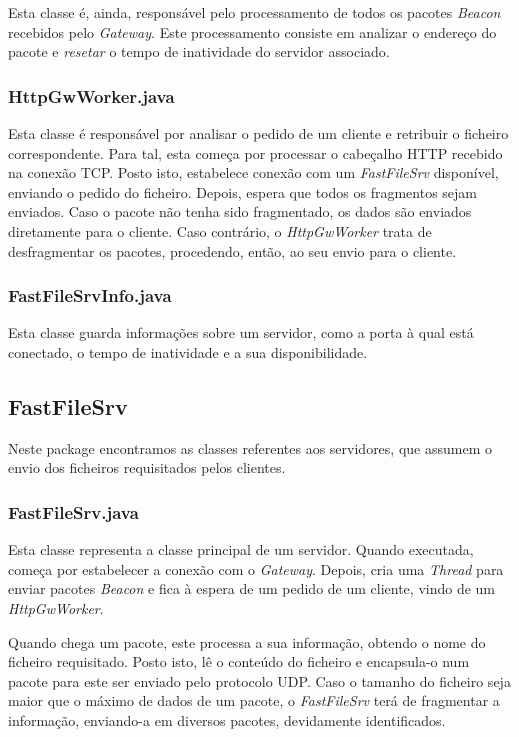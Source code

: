 \documentclass[11pt]{article}
\begin{document}
Esta classe é, ainda, responsável pelo processamento de todos os pacotes \textit{Beacon} recebidos pelo \textit{Gateway}. Este processamento consiste em analizar o endereço do pacote e \textit{resetar} o tempo de inatividade do servidor associado.

\subsubsection{HttpGwWorker.java}

Esta classe é responsável por analisar o pedido de um cliente e retribuir o ficheiro correspondente. Para tal, esta começa por processar o cabeçalho HTTP recebido na conexão TCP. Posto isto, estabelece conexão com um \textit{FastFileSrv} disponível, enviando o pedido do ficheiro. Depois, espera que todos os fragmentos sejam enviados. Caso o pacote não tenha sido fragmentado, os dados são enviados diretamente para o cliente. Caso contrário, o \textit{HttpGwWorker} trata de desfragmentar os pacotes, procedendo, então, ao seu envio para o cliente.

\subsubsection{FastFileSrvInfo.java}

Esta classe guarda informações sobre um servidor, como a porta à qual está conectado, o tempo de inatividade e a sua disponibilidade.


\subsection{FastFileSrv}

Neste package encontramos as classes referentes aos servidores, que assumem o envio dos ficheiros requisitados pelos clientes.

\subsubsection{FastFileSrv.java}

Esta classe representa a classe principal de um servidor. Quando executada, começa por estabelecer a conexão com o \textit{Gateway}. Depois, cria uma \textit{Thread} para enviar pacotes \textit{Beacon} e fica à espera de um pedido de um cliente, vindo de um \textit{HttpGwWorker}.

Quando chega um pacote, este processa a sua informação, obtendo o nome do ficheiro requisitado. Posto isto, lê o conteúdo do ficheiro e encapsula-o num pacote para este ser enviado pelo protocolo UDP. Caso o tamanho do ficheiro seja maior que o máximo de dados de um pacote, o \textit{FastFileSrv} terá de fragmentar a informação, enviando-a em diversos pacotes, devidamente identificados.
\end{document}

